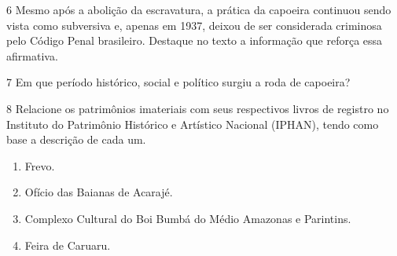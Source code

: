 \pagebreak
\num{6} Mesmo após a abolição da escravatura, a prática da capoeira continuou
  sendo vista como subversiva e, apenas em 1937, deixou de ser considerada
  criminosa pelo Código Penal brasileiro. Destaque no texto a informação
  que reforça essa afirmativa.


\num{7} Em que período histórico, social e político surgiu a roda de
  capoeira?


\num{8} Relacione os patrimônios imateriais com seus respectivos livros de
  registro no Instituto do Patrimônio Histórico e Artístico Nacional
  (IPHAN), tendo como base a descrição de cada um.

\begin{enumerate}
\item Frevo.

\item Ofício das Baianas de Acarajé.

\item Complexo Cultural do Boi Bumbá do Médio Amazonas e Parintins.

\item Feira de Caruaru.
\end{enumerate}

